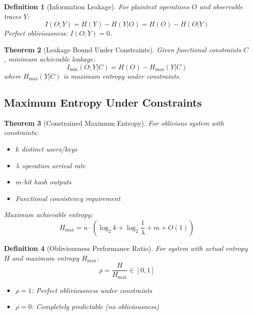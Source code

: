 \documentclass[11pt,final,hidelinks]{article}
\newtheorem{theorem}{Theorem}[section]
\newtheorem{definition}[theorem]{Definition}
\begin{document}
\begin{definition}[Information Leakage]
For plaintext operations $O$ and observable traces $Y$:
\begin{equation}
I(O; Y) = H(Y) - H(Y|O) = H(O) - H(O|Y)
\end{equation}
Perfect obliviousness: $I(O; Y) = 0$.
\end{definition}

\begin{theorem}[Leakage Bound Under Constraints]
Given functional constraints $C$, minimum achievable leakage:
\begin{equation}
I_{\min}(O; Y | C) = H(O) - H_{\max}(Y | C)
\end{equation}
where $H_{\max}(Y | C)$ is maximum entropy under constraints.
\end{theorem}

\subsection{Maximum Entropy Under Constraints}

\begin{theorem}[Constrained Maximum Entropy]
For oblivious system with constraints:
\begin{itemize}
    \item $k$ distinct users/keys
    \item $\lambda$ operation arrival rate  
    \item $m$-bit hash outputs
    \item Functional consistency requirement
\end{itemize}
Maximum achievable entropy:
\begin{equation}
H_{\max} = n \cdot \left(\log_2 k + \log_2 \frac{1}{\lambda} + m + O(1)\right)
\end{equation}
\end{theorem}

\begin{definition}[Obliviousness Performance Ratio]
For system with actual entropy $H$ and maximum entropy $H_{\max}$:
\begin{equation}
\rho = \frac{H}{H_{\max}} \in [0, 1]
\end{equation}
\begin{itemize}
    \item $\rho = 1$: Perfect obliviousness under constraints
    \item $\rho = 0$: Completely predictable (no obliviousness)
\end{itemize}
\end{definition}
\end{document}
